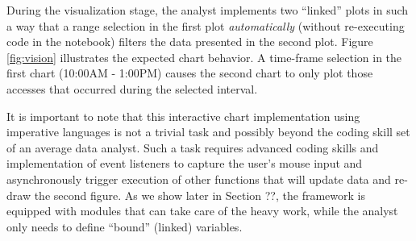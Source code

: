 {During the visualization stage, the analyst implements two ``linked'' plots in such a way that a range selection in the first plot \textit{automatically} (without re-executing code in the notebook) filters the data presented in the second plot. Figure \ref{fig:vision} illustrates the expected chart behavior. A time-frame selection in the first chart (10:00AM - 1:00PM) causes the second chart to only plot those accesses that occurred during the selected interval. 

It is important to note that this interactive chart implementation using imperative languages is not a trivial task and possibly beyond the coding skill set of an average data analyst. Such a task requires advanced coding skills and implementation of event listeners to capture the user's mouse input and asynchronously trigger execution of other functions that will update data and re-draw the second figure. As we show later in Section ??, the {\projname} framework is equipped with modules that can take care of the heavy work, while the analyst only needs to define ``bound'' (linked) variables.
}